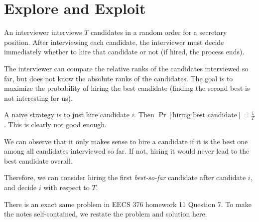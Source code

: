 \chapter {Explore and Exploit}

\begin{problem}
An interviewer interviews $T$ candidates in a random order for a secretary position. After interviewing each candidate, the interviewer must decide immediately whether to hire that candidate or not (if hired, the process ends).

The interviewer can compare the relative ranks of the candidates interviewed so far, but does not know the absolute ranks of the candidates. The goal is to maximize the probability of hiring the best candidate (finding the second best is not interesting for us).
\end{problem}

A naive strategy is to just hire candidate $i$. Then $\Pr[\text{hiring best candidate}] = \frac{1}{T}$. This is clearly not good enough.

\begin{remark}
	We can observe that it only makes sense to hire a candidate if it is the best one among all candidates interviewed so far. If not, hiring it would never lead to the best candidate overall.
\end{remark}

Therefore, we can consider hiring the first \textit{best-so-far} candidate after candidate $i$, and decide $i$ with respect to $T$.

There is an exact same problem in EECS 376 homework 11 Question 7. To make the notes self-contained, we restate the problem and solution here.

